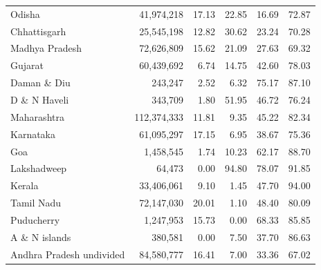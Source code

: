 \documentclass[11pt,a4paper]{report}
\begin{document}
\begin{longtable}{>{\raggedright\arraybackslash}p{5.0cm}rrrrr}
Odisha & 41,974,218 & 17.13 & 22.85 & 16.69 & 72.87 \\
Chhattisgarh & 25,545,198 & 12.82 & 30.62 & 23.24 & 70.28 \\
Madhya Pradesh & 72,626,809 & 15.62 & 21.09 & 27.63 & 69.32 \\
Gujarat & 60,439,692 & 6.74 & 14.75 & 42.60 & 78.03 \\
Daman \& Diu & 243,247 & 2.52 & 6.32 & 75.17 & 87.10 \\
D \& N Haveli & 343,709 & 1.80 & 51.95 & 46.72 & 76.24 \\
Maharashtra & 112,374,333 & 11.81 & 9.35 & 45.22 & 82.34 \\
Karnataka & 61,095,297 & 17.15 & 6.95 & 38.67 & 75.36 \\
Goa & 1,458,545 & 1.74 & 10.23 & 62.17 & 88.70 \\
Lakshadweep & 64,473 & 0.00 & 94.80 & 78.07 & 91.85 \\
Kerala & 33,406,061 & 9.10 & 1.45 & 47.70 & 94.00 \\
Tamil Nadu & 72,147,030 & 20.01 & 1.10 & 48.40 & 80.09 \\
Puducherry & 1,247,953 & 15.73 & 0.00 & 68.33 & 85.85 \\
A \& N islands & 380,581 & 0.00 & 7.50 & 37.70 & 86.63 \\
Andhra Pradesh undivided & 84,580,777 & 16.41 & 7.00 & 33.36 & 67.02 \\
\end{longtable}\endgroup
\begingroup\footnotesize\setlength{\tabcolsep}{4pt}
\end{document}
